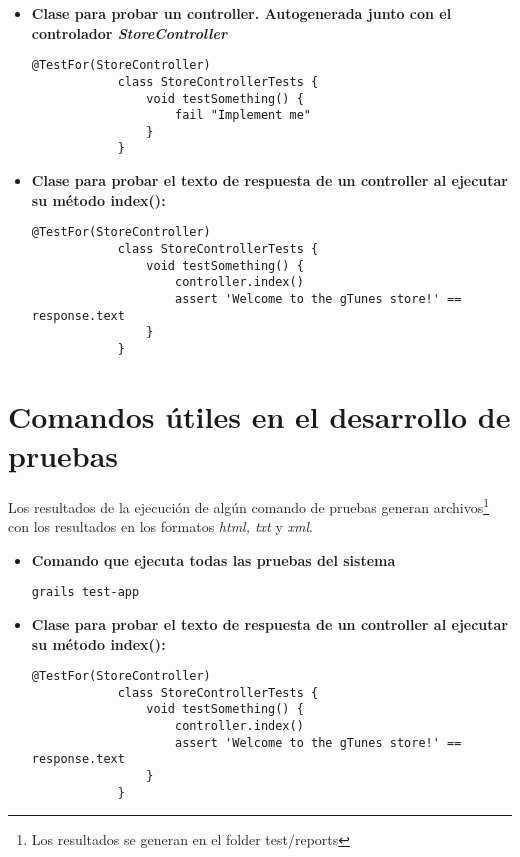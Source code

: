 \begin{itemize}

    \item \textbf{Clase para probar un controller. Autogenerada junto con el controlador \textit{StoreController}}
        \begin{lstlisting}[gobble=11]             
            @TestFor(StoreController)
            class StoreControllerTests {
                void testSomething() {
                    fail "Implement me"
                }
            }
        \end{lstlisting}

    \item \textbf{Clase para probar el texto de respuesta de un controller al ejecutar su m\'etodo \textmd{index()}:}
        \begin{lstlisting}[gobble=11]             
            @TestFor(StoreController)
            class StoreControllerTests {
                void testSomething() {
                    controller.index()
                    assert 'Welcome to the gTunes store!' == response.text
                }
            }        
        \end{lstlisting}

        

\end{itemize}

\section{Comandos \'utiles en el desarrollo de pruebas}
Los resultados de la ejecuci\'on de alg\'un comando de pruebas generan archivos\footnote{Los resultados se generan en el folder test/reports} con los resultados en los formatos \textit{html, txt} y \textit{xml}.
\begin{itemize}

    \item \textbf{Comando que ejecuta todas las pruebas del sistema}
        \begin{lstlisting}[gobble=11]             
            grails test-app
        \end{lstlisting}

    \item \textbf{Clase para probar el texto de respuesta de un controller al ejecutar su m\'etodo \textmd{index()}:}
        \begin{lstlisting}[gobble=11]             
            @TestFor(StoreController)
            class StoreControllerTests {
                void testSomething() {
                    controller.index()
                    assert 'Welcome to the gTunes store!' == response.text
                }
            }        
        \end{lstlisting}

        

\end{itemize}
